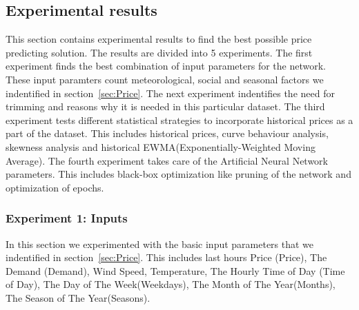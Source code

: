 \subsection{Experimental results}
This section contains experimental results to find the best possible price predicting solution. The results are divided into 5 experiments. The first experiment finds the best combination of input parameters for the network. These input paramters count meteorological, social and seasonal factors we indentified in section~\ref{sec:Price}. The next experiment indentifies the need for trimming and reasons why it is needed in this particular dataset. The third experiment tests different statistical strategies to incorporate historical prices as a part of the dataset. This includes historical prices, curve behaviour analysis, skewness analysis and historical EWMA(Exponentially-Weighted Moving Average). The fourth experiment takes care of the Artificial Neural Network parameters. This includes black-box optimization like pruning of the network and optimization of epochs.

\subsubsection{Experiment 1: Inputs}
In this section we experimented with the basic input parameters that we indentified in section~\ref{sec:Price}. This includes last hours Price (Price), The Demand (Demand), Wind Speed, Temperature, The Hourly Time of Day (Time of Day), The Day of The Week(Weekdays), The Month of The Year(Months), The Season of The Year(Seasons).

